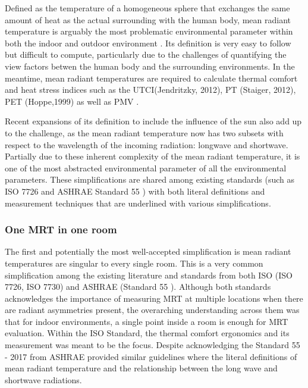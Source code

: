 Defined as the temperature of a homogeneous sphere that exchanges the same amount of heat as the actual surrounding with the human body, mean radiant temperature is arguably the most problematic environmental parameter within both the indoor and outdoor environment \cite{kantor_most_2011}. Its definition is very easy to follow but difficult to compute, particularly due to the challenges of quantifying the view factors betwen the human body and the surrounding environments. In the meantime, mean radiant temperatures are required to calculate thermal comfort and heat stress indices such as the UTCI(Jendritzky, 2012), PT (Staiger, 2012), PET (Hoppe,1999) as well as PMV \cite{fanger_calculation_1967}. 

Recent expansions of its definition to include the influence of the sun also add up to the challenge, as the mean radiant temperature now has two subsets with respect to the wavelength of the incoming radiation: longwave and shortwave\cite{ansi/ashrae_standard_2017}. Partially due to these inherent complexity of the mean radiant temperature, it is one of the most abstracted environmental parameter of all the environmental parameters. These simplifications are shared among existing standards (such as ISO 7726 \cite{standardization_iso7726_2001} and ASHRAE Standard 55 \cite{ansi/ashrae_standard_2017}) with both literal definitions and measurement techniques that are underlined with various simplifications. 
\subsubsection{One MRT in one room}
    The first and potentially the most well-accepted simplification is mean radiant temperatures are singular to every single room. This is a very common simplification among the existing literature and standards from both ISO (ISO 7726\cite{standardization_iso7726_2001}, ISO 7730\cite{iso_iso_2005}) and ASHRAE (Standard 55 \cite{ansi/ashrae_standard_2017}). Although both standards acknowledges the importance of measuring MRT at multiple locations when there are radiant asymmetries present, the overarching understanding across them was that for indoor environments, a single point inside a room is enough for MRT evaluation. 
    Within the ISO Standard, the thermal comfort ergonomics and its measurement was meant to be the focus. Despite acknowledging the  Standard 55 - 2017 from ASHRAE provided similar guidelines where the literal definitions of mean radiant temperature and the relationship between the long wave and shortwave radiations. 

